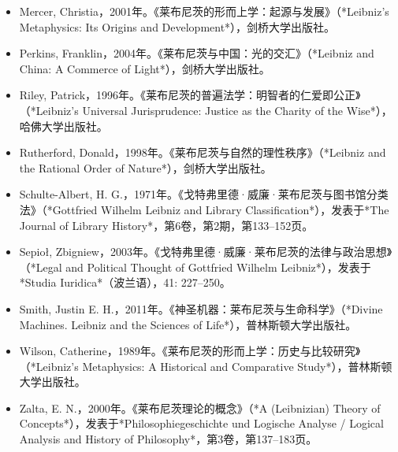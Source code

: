 \begin{itemize}
\item Mercer, Christia，2001年。《莱布尼茨的形而上学：起源与发展》（*Leibniz's Metaphysics: Its Origins and Development*），剑桥大学出版社。  
\item Perkins, Franklin，2004年。《莱布尼茨与中国：光的交汇》（*Leibniz and China: A Commerce of Light*），剑桥大学出版社。  
\item Riley, Patrick，1996年。《莱布尼茨的普遍法学：明智者的仁爱即公正》（*Leibniz's Universal Jurisprudence: Justice as the Charity of the Wise*），哈佛大学出版社。  
\item Rutherford, Donald，1998年。《莱布尼茨与自然的理性秩序》（*Leibniz and the Rational Order of Nature*），剑桥大学出版社。  
\item Schulte-Albert, H. G.，1971年。《戈特弗里德·威廉·莱布尼茨与图书馆分类法》（*Gottfried Wilhelm Leibniz and Library Classification*），发表于*The Journal of Library History*，第6卷，第2期，第133–152页。  
\item Sepioł, Zbigniew，2003年。《戈特弗里德·威廉·莱布尼茨的法律与政治思想》（*Legal and Political Thought of Gottfried Wilhelm Leibniz*），发表于*Studia Iuridica*（波兰语），41: 227–250。  
\item Smith, Justin E. H.，2011年。《神圣机器：莱布尼茨与生命科学》（*Divine Machines. Leibniz and the Sciences of Life*），普林斯顿大学出版社。  
\item Wilson, Catherine，1989年。《莱布尼茨的形而上学：历史与比较研究》（*Leibniz's Metaphysics: A Historical and Comparative Study*），普林斯顿大学出版社。  
\item Zalta, E. N.，2000年。《莱布尼茨理论的概念》（*A (Leibnizian) Theory of Concepts*），发表于*Philosophiegeschichte und Logische Analyse / Logical Analysis and History of Philosophy*，第3卷，第137–183页。
\end{itemize}